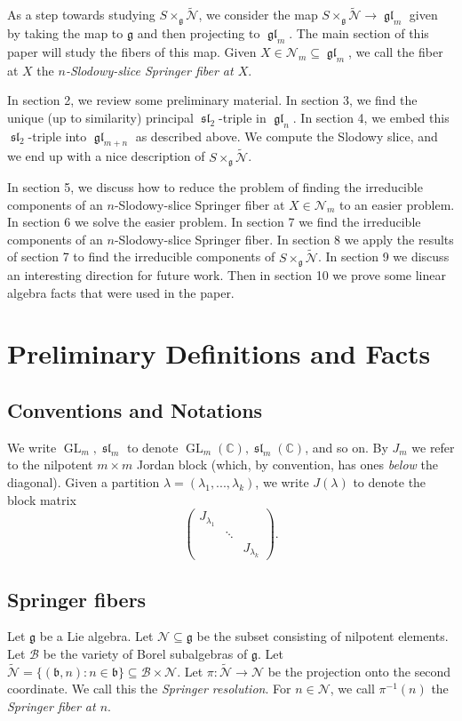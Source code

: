 \documentclass[12pt,psamsfonts]{article}
\DeclareMathOperator{\GL}{GL}
\DeclareMathOperator{\gl}{\mathfrak{gl}}
\DeclareMathOperator{\spl}{\mathfrak{sl}}
\begin{document}
As a step towards studying \(S \times_\mathfrak{g} \widetilde{\mathcal{N}}\), we consider the map \(S \times_\mathfrak{g} \widetilde{\mathcal{N}} \to \gl_m\) given by taking the map to \(\mathfrak{g}\) and then projecting to \(\gl_m\).
The main section of this paper will study the fibers of this map.
Given \(X \in \mathcal{N}_m \subseteq \gl_m\), we call the fiber at \(X\) the \emph{\(n\)-Slodowy-slice Springer fiber at \(X\)}.
\par In section 2, we review some preliminary material.
In section 3, we find the unique (up to similarity) principal \(\spl_2\)-triple in \(\gl_n\).
In section 4, we embed this \(\spl_2\)-triple into \(\gl_{m + n}\) as described above.
We compute the Slodowy slice, and we end up with a nice description of \(S \times_\mathfrak{g} \widetilde{\mathcal{N}}\).
\par In section 5, we discuss how to reduce the problem of finding the irreducible components of an \(n\)-Slodowy-slice Springer fiber at \(X \in \mathcal{N}_m\) to an easier problem.
In section 6 we solve the easier problem.
In section 7 we find the irreducible components of an \(n\)-Slodowy-slice Springer fiber.
In section 8 we apply the results of section 7 to find the irreducible components of \(S \times_\mathfrak{g} \widetilde{\mathcal{N}}\).
In section 9 we discuss an interesting direction for future work.
Then in section 10 we prove some linear algebra facts that were used in the paper.

\section{Preliminary Definitions and Facts}
\subsection{Conventions and Notations}
We write \(\GL_m, \spl_m\) to denote \(\GL_m(\mathbb{C}), \spl_m(\mathbb{C})\), and so on.
By \(J_m\) we refer to the nilpotent \(m \times m\) Jordan block (which, by convention, has ones \emph{below} the diagonal).
Given a partition \(\lambda = (\lambda_1, ..., \lambda_k)\), we write \(J(\lambda)\) to denote the block matrix
\[\begin{pmatrix}
    J_{\lambda_1} \\
    & \ddots \\
    & & J_{\lambda_k}
\end{pmatrix}.\]

\subsection{Springer fibers}
Let \(\mathfrak{g}\) be a Lie algebra.
Let \(\mathcal{N} \subseteq \mathfrak{g}\) be the subset consisting of nilpotent elements.
Let \(\mathcal{B}\) be the variety of Borel subalgebras of \(\mathfrak{g}\).
Let \(\widetilde{\mathcal{N}} = \{(\mathfrak{b}, n) : n \in \mathfrak{b}\} \subseteq \mathcal{B} \times \mathcal{N}\).
Let \(\pi : \widetilde{\mathcal{N}} \to \mathcal{N}\) be the projection onto the second coordinate.
We call this the \emph{Springer resolution}.
For \(n \in \mathcal{N}\), we call \(\pi^{-1}(n)\) the \emph{Springer fiber at \(n\)}.
\end{document}
